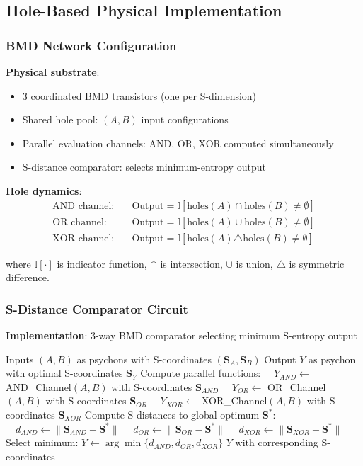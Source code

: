 \documentclass[11pt,a4paper]{article}
\begin{document}
\subsection{Hole-Based Physical Implementation}

\subsubsection{BMD Network Configuration}

\textbf{Physical substrate}:
\begin{itemize}
\item 3 coordinated BMD transistors (one per S-dimension)
\item Shared hole pool: $(A, B)$ input configurations
\item Parallel evaluation channels: AND, OR, XOR computed simultaneously
\item S-distance comparator: selects minimum-entropy output
\end{itemize}

\textbf{Hole dynamics}:
\begin{align}
\text{AND channel}: \quad &\text{Output} = \mathbb{I}[\text{holes}(A) \cap \text{holes}(B) \neq \emptyset] \\
\text{OR channel}: \quad &\text{Output} = \mathbb{I}[\text{holes}(A) \cup \text{holes}(B) \neq \emptyset] \\
\text{XOR channel}: \quad &\text{Output} = \mathbb{I}[\text{holes}(A) \triangle \text{holes}(B) \neq \emptyset]
\end{align}

where $\mathbb{I}[\cdot]$ is indicator function, $\cap$ is intersection, $\cup$ is union, $\triangle$ is symmetric difference.

\subsubsection{S-Distance Comparator Circuit}

\textbf{Implementation}: 3-way BMD comparator selecting minimum S-entropy output

\begin{algorithm}[H]
\caption{S-Entropy Logic Gate Operation}
\begin{algorithmic}[1]
\REQUIRE Inputs $(A, B)$ as psychons with S-coordinates $(\mathbf{S}_A, \mathbf{S}_B)$
\ENSURE Output $Y$ as psychon with optimal S-coordinates $\mathbf{S}_Y$
\STATE Compute parallel functions:
\STATE $\quad Y_{AND} \leftarrow $ AND\_Channel$(A, B)$ with S-coordinates $\mathbf{S}_{AND}$
\STATE $\quad Y_{OR} \leftarrow $ OR\_Channel$(A, B)$ with S-coordinates $\mathbf{S}_{OR}$
\STATE $\quad Y_{XOR} \leftarrow $ XOR\_Channel$(A, B)$ with S-coordinates $\mathbf{S}_{XOR}$
\STATE Compute S-distances to global optimum $\mathbf{S}^*$:
\STATE $\quad d_{AND} \leftarrow \|\mathbf{S}_{AND} - \mathbf{S}^*\|$
\STATE $\quad d_{OR} \leftarrow \|\mathbf{S}_{OR} - \mathbf{S}^*\|$
\STATE $\quad d_{XOR} \leftarrow \|\mathbf{S}_{XOR} - \mathbf{S}^*\|$
\STATE Select minimum: $Y \leftarrow \arg\min\{d_{AND}, d_{OR}, d_{XOR}\}$
\RETURN $Y$ with corresponding S-coordinates
\end{algorithmic}
\end{algorithm}
\end{document}
